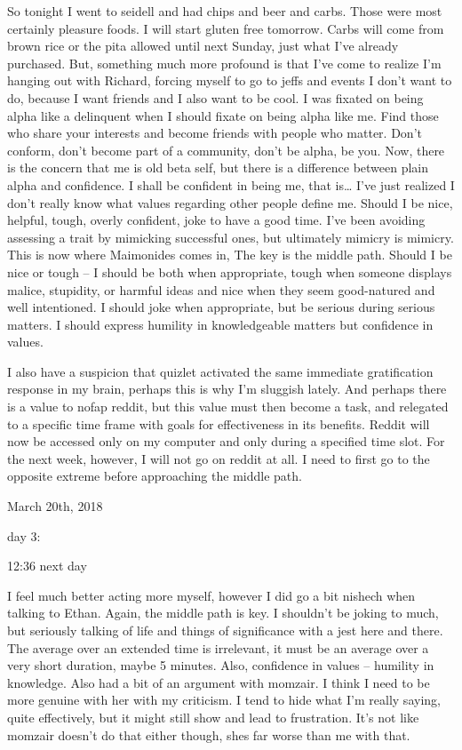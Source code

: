 So tonight I went to seidell and had chips and beer and carbs. Those
were most certainly pleasure foods. I will start gluten free tomorrow.
Carbs will come from brown rice or the pita allowed until next Sunday,
just what I've already purchased. But, something much more profound is
that I've come to realize I'm hanging out with Richard, forcing myself
to go to jeffs and events I don't want to do, because I want friends and
I also want to be cool. I was fixated on being alpha like a delinquent
when I should fixate on being alpha like me. Find those who share your
interests and become friends with people who matter. Don't conform,
don't become part of a community, don't be alpha, be you. Now, there is
the concern that me is old beta self, but there is a difference between
plain alpha and confidence. I shall be confident in being me, that
is\ldots{} I've just realized I don't really know what values regarding
other people define me. Should I be nice, helpful, tough, overly
confident, joke to have a good time. I've been avoiding assessing a
trait by mimicking successful ones, but ultimately mimicry is mimicry.
This is now where Maimonides comes in, The key is the middle path.
Should I be nice or tough -- I should be both when appropriate, tough
when someone displays malice, stupidity, or harmful ideas and nice when
they seem good-natured and well intentioned. I should joke when
appropriate, but be serious during serious matters. I should express
humility in knowledgeable matters but confidence in values.

I also have a suspicion that quizlet activated the same immediate
gratification response in my brain, perhaps this is why I'm sluggish
lately. And perhaps there is a value to nofap reddit, but this value
must then become a task, and relegated to a specific time frame with
goals for effectiveness in its benefits. Reddit will now be accessed
only on my computer and only during a specified time slot. For the next
week, however, I will not go on reddit at all. I need to first go to the
opposite extreme before approaching the middle path.

\bigskip
\bigskip
March 20th, 2018

day 3:

12:36 next day

I feel much better acting more myself, however I did go a bit nishech
when talking to Ethan. Again, the middle path is key. I shouldn't be
joking to much, but seriously talking of life and things of significance
with a jest here and there. The average over an extended time is
irrelevant, it must be an average over a very short duration, maybe 5
minutes. Also, confidence in values -- humility in knowledge. Also had a
bit of an argument with momzair. I think I need to be more genuine with
her with my criticism. I tend to hide what I'm really saying, quite
effectively, but it might still show and lead to frustration. It's not
like momzair doesn't do that either though, shes far worse than me with
that.

